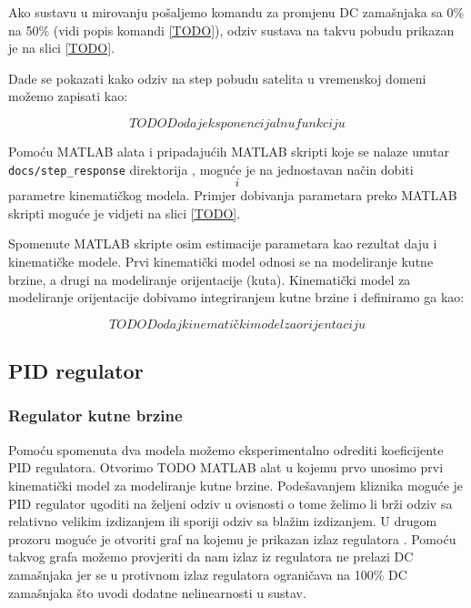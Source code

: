 \documentclass[times, utf8, diplomski, numeric]{templates/template}
\begin{document}
{{{            Ako sustavu u mirovanju pošaljemo komandu za promjenu DC zamašnjaka sa 0\% na 50\% (vidi popis komandi \ref{TODO}), odziv sustava na takvu pobudu prikazan je na slici \ref{TODO}. 


            Dade se pokazati kako odziv na step pobudu satelita u vremenskoj domeni možemo zapisati kao:

            \begin{equation}
                TODO Dodaj eksponencijalnu funkciju
            \end{equation}

            Pomoću MATLAB alata i pripadajućih MATLAB skripti koje se nalaze unutar \texttt{docs/step\_response} direktorija \cite{dodajLinkNaFolder}, moguće je na jednostavan način dobiti $$ i $$ parametre kinematičkog modela. Primjer dobivanja parametara preko MATLAB skripti moguće je vidjeti na slici \ref{TODO}. 


            Spomenute MATLAB skripte osim estimacije parametara kao rezultat daju i kinematičke modele. Prvi kinematički model odnosi se na modeliranje kutne brzine, a drugi na modeliranje orijentacije (kuta). Kinematički model za modeliranje orijentacije dobivamo integriranjem kutne brzine i definiramo ga kao:

            \begin{equation}
                TODO Dodaj kinematički model za orijentaciju
            \end{equation}
        }
    
        \subsection{PID regulator}{
            \subsubsection{Regulator kutne brzine}{
                Pomoću spomenuta dva modela možemo eksperimentalno odrediti koeficijente PID regulatora. Otvorimo TODO MATLAB alat u kojemu prvo unosimo prvi kinematički model za modeliranje kutne brzine. Podešavanjem kliznika moguće je PID regulator ugoditi na željeni odziv u ovisnosti o tome želimo li brži odziv sa relativno velikim izdizanjem  ili sporiji odziv sa blažim izdizanjem. U drugom prozoru moguće je otvoriti graf na kojemu je prikazan izlaz regulatora . Pomoću takvog grafa možemo provjeriti da nam izlaz iz regulatora ne prelazi DC zamašnjaka jer se u protivnom izlaz regulatora ograničava na 100\% DC zamašnjaka što uvodi dodatne nelinearnosti u sustav. 
            }

}}}
\end{document}
